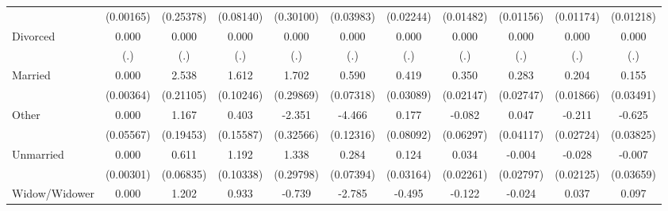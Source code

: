 {\begin{tabular}{l*{10}{c}}
                    &   (0.00165)         &   (0.25378)         &   (0.08140)         &   (0.30100)         &   (0.03983)         &   (0.02244)         &   (0.01482)         &   (0.01156)         &   (0.01174)         &   (0.01218)         \\
Divorced            &       0.000         &       0.000         &       0.000         &       0.000         &       0.000         &       0.000         &       0.000         &       0.000         &       0.000         &       0.000         \\
                    &         (.)         &         (.)         &         (.)         &         (.)         &         (.)         &         (.)         &         (.)         &         (.)         &         (.)         &         (.)         \\
Married             &       0.000         &       2.538\sym{***}&       1.612\sym{***}&       1.702\sym{***}&       0.590\sym{***}&       0.419\sym{***}&       0.350\sym{***}&       0.283\sym{***}&       0.204\sym{***}&       0.155\sym{***}\\
                    &   (0.00364)         &   (0.21105)         &   (0.10246)         &   (0.29869)         &   (0.07318)         &   (0.03089)         &   (0.02147)         &   (0.02747)         &   (0.01866)         &   (0.03491)         \\
Other               &       0.000         &       1.167\sym{***}&       0.403\sym{**} &      -2.351\sym{***}&      -4.466\sym{***}&       0.177\sym{*}  &      -0.082         &       0.047         &      -0.211\sym{***}&      -0.625\sym{***}\\
                    &   (0.05567)         &   (0.19453)         &   (0.15587)         &   (0.32566)         &   (0.12316)         &   (0.08092)         &   (0.06297)         &   (0.04117)         &   (0.02724)         &   (0.03825)         \\
Unmarried           &       0.000         &       0.611\sym{***}&       1.192\sym{***}&       1.338\sym{***}&       0.284\sym{***}&       0.124\sym{***}&       0.034         &      -0.004         &      -0.028         &      -0.007         \\
                    &   (0.00301)         &   (0.06835)         &   (0.10338)         &   (0.29798)         &   (0.07394)         &   (0.03164)         &   (0.02261)         &   (0.02797)         &   (0.02125)         &   (0.03659)         \\
Widow/Widower       &       0.000         &       1.202\sym{***}&       0.933\sym{***}&      -0.739\sym{*}  &      -2.785\sym{***}&      -0.495\sym{***}&      -0.122\sym{***}&      -0.024         &       0.037         &       0.097\sym{**} \\

\end{tabular}}
